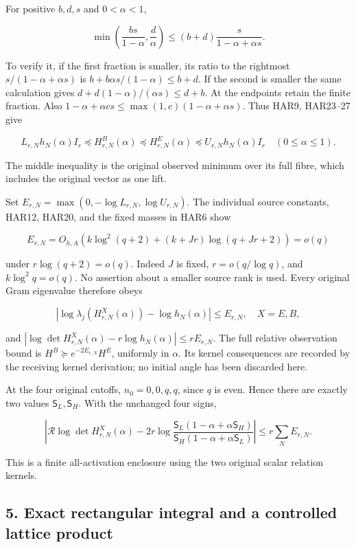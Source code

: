 \documentclass[11pt]{article}
\begin{document}
For positive \(b,d,s\) and \(0<\alpha<1\),

\[
\min\left(\frac{bs}{1-\alpha},\frac d\alpha\right)
\le(b+d)\frac{s}{1-\alpha+\alpha s}.
\tag{HAR27}
\]

To verify it, if the first fraction is smaller, its ratio to the rightmost \(s/(1-\alpha+\alpha s)\) is \(b+b\alpha s/(1-\alpha)\le b+d\). If the second is smaller the same calculation gives \(d+d(1-\alpha)/(\alpha s)\le d+b\). At the endpoints retain the finite fraction. Also \(1-\alpha+\alpha c s\le\max(1,c)(1-\alpha+\alpha s)\). Thus HAR9, HAR23--27 give

\[
\boxed{
L_{r,N}h_N(\alpha)I_r\preceq H^B_{r,N}(\alpha)
\preceq H^E_{r,N}(\alpha)\preceq U_{r,N}h_N(\alpha)I_r
\quad(0\le\alpha\le1).
}
\tag{HAR28}
\]

The middle inequality is the original observed minimum over its full fibre, which includes the original vector as one lift.

Set \(E_{r,N}=\max(0,-\log L_{r,N},\log U_{r,N})\). The individual source constants, HAR12, HAR20, and the fixed masses in HAR6 show

\[
E_{r,N}=O_{h,A}\left(k\log^2(q+2)+(k+Jr)\log(q+Jr+2)\right)=o(q)
\tag{HAR29}
\]

under \(r\log(q+2)=o(q)\). Indeed \(J\) is fixed, \(r=o(q/\log q)\), and \(k\log^2q=o(q)\). No assertion about a smaller source rank is used. Every original Gram eigenvalue therefore obeys

\[
|\log\lambda_j(H^X_{r,N}(\alpha))-\log h_N(\alpha)|\le E_{r,N},
\quad X=E,B,
\tag{HAR30}
\]

and \(|\log\det H^X_{r,N}(\alpha)-r\log h_N(\alpha)|\le rE_{r,N}\). The full relative observation bound is \(H^B\succeq e^{-2E_{r,N}}H^E\), uniformly in \(\alpha\). Its kernel consequences are recorded by the receiving kernel derivation; no initial angle has been discarded here.

At the four original cutoffs, \(n_0=0,0,q,q\), since \(q\) is even. Hence there are exactly two values \(\mathsf S_L,\mathsf S_H\). With the unchanged four signs,

\[
\boxed{
\left|\mathcal R\log\det H^X_{r,N}(\alpha)
-2r\log\frac{\mathsf S_L(1-\alpha+\alpha\mathsf S_H)}
{\mathsf S_H(1-\alpha+\alpha\mathsf S_L)}\right|
\le r\sum_N E_{r,N}.
}
\tag{HAR31}
\]

This is a finite all-activation enclosure using the two original scalar relation kernels.

\subsection{5. Exact rectangular integral and a controlled lattice product}\label{exact-rectangular-integral-and-a-controlled-lattice-product}
\end{document}
